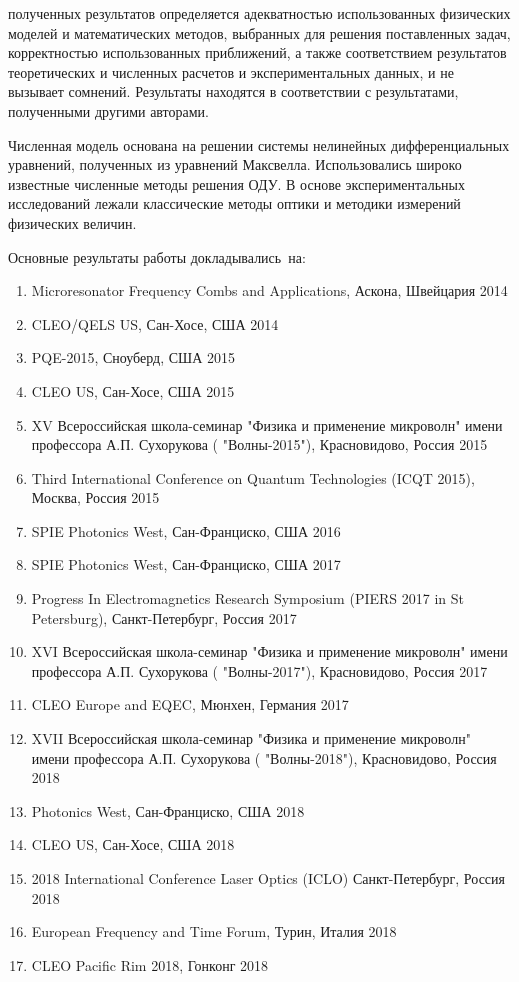 {\reliability} полученных результатов определяется адекватностью использованных физических моделей и математических методов, выбранных для решения поставленных задач, корректностью использованных приближений, а также
соответствием результатов теоретических и численных расчетов и экспериментальных данных, и не вызывает сомнений. Результаты находятся в соответствии с результатами, полученными другими авторами.

Численная модель основана на решении системы нелинейных дифференциальных уравнений, полученных из уравнений Максвелла. Использовались широко известные численные методы решения ОДУ. В основе экспериментальных исследований лежали классические методы оптики и методики измерений физических величин.

{\probation}
Основные результаты работы докладывались~на:
\begin{enumerate}
  \item Microresonator Frequency Combs and Applications, Аскона, Швейцария 2014
  \item CLEO/QELS US, Сан-Хосе, США 2014
  \item PQE-2015, Сноуберд, США 2015
  \item CLEO US, Сан-Хосе, США 2015
  \item XV Всероссийская школа-семинар "Физика и применение микроволн" имени профессора А.П. Сухорукова ( "Волны-2015"), Красновидово, Россия 2015
  \item Third International Conference on Quantum Technologies (ICQT 2015), Москва, Россия 2015
  \item SPIE Photonics West, Сан-Франциско, США 2016
  \item SPIE Photonics West, Сан-Франциско, США 2017
  \item Progress In Electromagnetics Research Symposium (PIERS 2017 in St Petersburg), Санкт-Петербург, Россия 2017
  \item XVI Всероссийская школа-семинар "Физика и применение микроволн" имени профессора А.П. Сухорукова ( "Волны-2017"), Красновидово, Россия 2017
  \item CLEO Europe and EQEC, Мюнхен, Германия 2017
  \item XVII Всероссийская школа-семинар "Физика и применение микроволн" имени профессора А.П. Сухорукова ( "Волны-2018"), Красновидово, Россия 2018
  \item Photonics West, Сан-Франциско, США 2018
  \item CLEO US, Сан-Хосе, США 2018
  \item 2018 International Conference Laser Optics (ICLO)  Санкт-Петербург, Россия 2018
  \item European Frequency and Time Forum, Турин, Италия 2018
  \item CLEO Pacific Rim 2018, Гонконг 2018
\end{enumerate}


